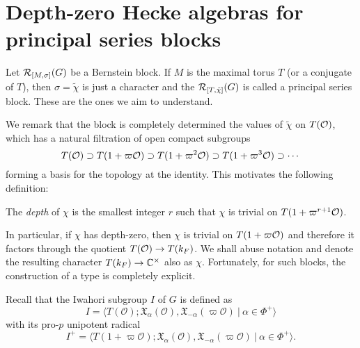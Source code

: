 \section{Depth-zero Hecke algebras for principal series blocks}
    Let $\mathcal{R}_{[M,\sigma]}(G)$ be a Bernstein block. If $M$ is the maximal torus $T$ (or a conjugate of $T$), then $\sigma=\tilde\chi$ is just a character and the $\mathcal{R}_{[T,\tilde\chi]}(G)$ is called a principal series block. These are the ones we aim to understand.

    We remark that the block is completely determined the values of $\tilde\chi$ on $T(\mathcal{O})$, which has a natural filtration of open compact subgroups
    $$T(\mathcal{O})\supset T(1+\varpi\mathcal{O})\supset T(1+\varpi^2\mathcal{O})\supset T(1+\varpi^3\mathcal{O})\supset\cdots$$
    forming a basis for the topology at the identity.
    This motivates the following definition:
    \begin{definition}
        The \textit{depth} of $\chi$ is the smallest integer $r$ such that $\chi$ is trivial on $T(1+\varpi^{r+1}\mathcal{O})$.
    \end{definition}
    In particular, if $\chi$ has depth-zero, then $\chi$ is trivial on $T(1+\varpi\mathcal{O})$ and therefore it factors through the quotient $T(\mathcal{O})\rightarrow T(k_F)$. We shall abuse notation and denote the resulting character $T(k_F)\rightarrow \mathbb{C}^{\times}$ also as $\chi$. Fortunately, for such blocks, the construction of a type is completely explicit.

    Recall that the Iwahori subgroup $I$ of $G$ is defined as 
    $$I=\langle T(\mathcal{\mathcal{O}}); \mathfrak{X}_\alpha(\mathcal{O}),\mathfrak{X}_{-\alpha}(\varpi\mathcal{O})\ |\ \alpha\in\Phi^+\rangle$$
    with its pro-$p$ unipotent radical
    $$I^+=\langle T(1+\varpi\mathcal{\mathcal{O}}); \mathfrak{X}_\alpha(\mathcal{O}),\mathfrak{X}_{-\alpha}(\varpi\mathcal{O})\ |\ \alpha\in\Phi^+\rangle.$$



